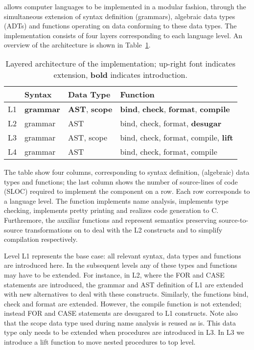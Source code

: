 \noindent \Rascal allows computer languages to be implemented in a modular
fashion, through the simultaneous extension of syntax definition
(grammars), algebraic data types (ADTs) and functions operating on
data conforming to these data types. The \oberon implementation
consists of four layers corresponding to each language level. An
overview of the architecture is shown in Table~\ref{TBL:rascalArch}.

\begin{table}
\begin{center}\small
\begin{tabular}{|l||l|l|l|}\hline
   &  Syntax & Data Type & Function \\\hline\hline
L1 &  \textbf{grammar} & \textbf{AST}, \textbf{scope} & 
\textbf{bind}, \textbf{check}, \textbf{format}, \textbf{compile} \\\hline 
L2 & grammar & AST & bind, check, format, \textbf{desugar} \\\hline
L3 & grammar & AST, scope & bind, check, format, compile, \textbf{lift} \\\hline
L4 & grammar & AST & bind, check, format, compile\\\hline%
\end{tabular}
\end{center}
\caption{Layered architecture of the \Rascal \oberon implementation;
  up-right font indicates extension, \textbf{bold} indicates introduction.\label{TBL:rascalArch}}
\end{table}

The table show four columns, corresponding to syntax definition,
(algebraic) data types and functions; the last column shows the number of source-lines of code (SLOC) required to implement the component on a row.  Each row corresponds to a
language level. The function  implements name analysis,  implements type checking,  implements pretty printing and  realizes code generation to C. Furthremore, the auxiliar functions  and  represent semantics preserving source-to-source transformations on \oberon to deal with the L2 constructs and to simplify compilation respectively. 

Level L1 represents the base case: all relevant
syntax, data types and functions are introduced here. In the
subsequent levels any of these types and functions may have to be
extended. For instance, in L2, where the FOR and CASE statements are
introduced, the grammar and AST definition of L1 are extended with new
alternatives to deal with these constructs. Similarly, the functions
bind, check and format are extended. However, the compile function is
not extended; instead FOR and CASE statements are desugared to L1
constructs. Note also that the scope data type used during name
analysis is reused as is. This data type only needs to be extended
when procedures are introduced in L3. In L3 we introduce a lift
function to move nested procedures to top level.

